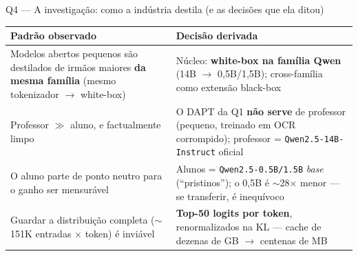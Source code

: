 \documentclass[10pt,aspectratio=169]{beamer}
\newcommand{\ruim}[1]{\textcolor{warnred}{\textbf{#1}}}
\begin{document}
\begin{frame}{Q4 — A investigação: como a indústria destila (e as decisões que ela ditou)}
  \small
  \begin{tabular}{@{}p{}p{}@{}}
    \toprule
    \textbf{Padrão observado} & \textbf{Decisão derivada} \\
    \midrule
    Modelos abertos pequenos são destilados de irmãos maiores \textbf{da mesma família}
    (mesmo tokenizador $\to$ white-box) &
    Núcleo: \textbf{white-box na família Qwen} (14B $\to$ 0,5B/1,5B); cross-família como extensão black-box \\[3pt]
    Professor $\gg$ aluno, e factualmente limpo &
    O DAPT da Q1 \ruim{não serve} de professor (pequeno, treinado em OCR corrompido);
    professor = \texttt{Qwen2.5-14B-Instruct} oficial \\[3pt]
    O aluno parte de ponto neutro para o ganho ser mensurável &
    Alunos = \texttt{Qwen2.5-0.5B/1.5B} \emph{base} (``pristinos''); o 0,5B é $\sim$28$\times$ menor
    — se transferir, é inequívoco \\[3pt]
    Guardar a distribuição completa ($\sim$151K entradas $\times$ token) é inviável &
    \textbf{Top-50 logits por token}, renormalizados na KL — cache de dezenas de GB $\to$ centenas de MB \\
    \bottomrule
  \end{tabular}
\end{frame}
\end{document}
